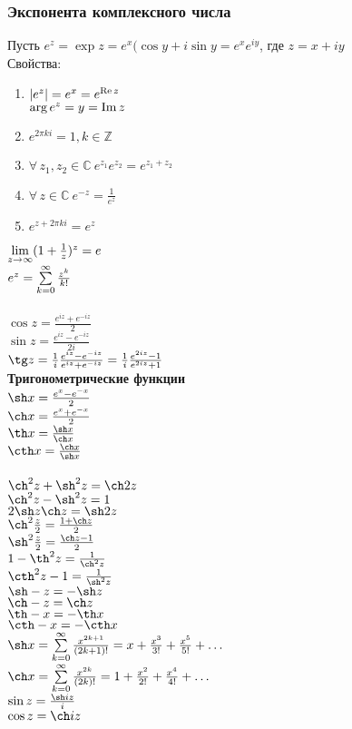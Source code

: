 \documentclass[12pt]{article}
\begin{document}
\subsubsection{Экспонента комплексного числа}
Пусть $e^z = \exp z = e^x(\cos y + i\sin y = e^x e^{iy}$, где $z = x+iy$\\
Свойства:
\begin{enumerate}
    \item $|e^z|=e^x=e^{\operatorname{Re} z}$\\
    $\arg e^z = y = \operatorname{Im} z$
    \item $e^{2\pi ki} = 1, k \in \mathbb{Z}$
    \item $\forall\,z_1,z_2 \in \mathbb{C}\ e^{z_1}e^{z_2} = e^{z_1+z_2}$
    \item $\forall\,z\in\mathbb{C}\ e^{-z} = \frac{1}{e^z}$
    \item $e^{z+2\pi k i} = e^z$
\end{enumerate}
$\lim\limits_{z\rightarrow \infty} (1+\frac1z)^z = e$\\
$e^z = \sum\limits_{k=0}^\infty \frac{z^k}{k!}$\\\\
$\cos z = \frac{e^{iz}+e^{-iz}}2$\\
$\sin z = \frac{e^{iz}-e^{-iz}}{2i}$\\
$\tg z = \frac1i\frac{e^{iz}-e^{-iz}}{e^{iz}+e^{-iz}} = \frac1i\frac{e^{2iz}-1}{e^{2iz}+1}$\\
\textbf{Тригонометрические функции}\\
$\sh x = \frac{e^x-e^{-x}}{2}$\\
$\ch x = \frac{e^x+e^{-x}}{2}$\\
$\th x = \frac{\sh x}{\ch x}$\\
$\cth x = \frac{\ch x}{\sh x}$\\\\
$\ch^2 z + \sh^2 z = \ch 2z$\\
$\ch^2 z - \sh^2 z = 1$\\
$2\sh z \ch z = \sh 2z$\\
$\ch^2 \frac z2 = \frac{1+\ch z}{2}$\\
$\sh^2 \frac z2 = \frac{\ch z-1}{2}$\\
$1-\th^2 z = \frac{1}{\ch^2 z}$\\
$\cth^2 z - 1 = \frac{1}{\sh^2 z}$\\
$\sh -z = - \sh z$\\
$\ch -z = \ch z$\\
$\th -x = -\th x$\\
$\cth -x = -\cth x$\\
$\sh x = \suml_{k=0}^\infty \frac{x^{2k+1}}{(2k+1)!} = x + \frac{x^3}{3!} + \frac{x^5}{5!} + \ldots$\\
$\ch x = \suml_{k=0}^\infty \frac{x^{2k}}{(2k)!} = 1 + \frac{x^2}{2!} + \frac{x^4}{4!} + \ldots$\\
$\sin z = \frac{\sh iz}{i}$\\
$\cos z = \ch iz$
\end{document}

